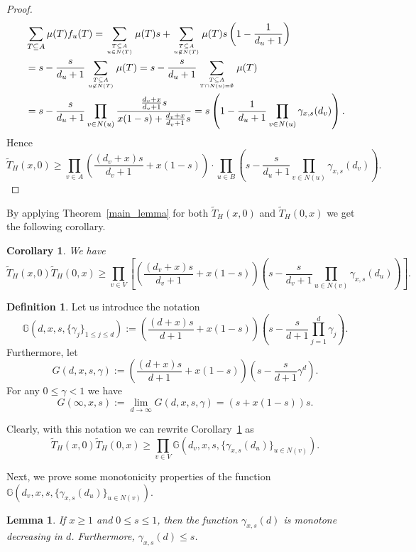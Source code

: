 \documentclass[12pt,a4paper]{amsart}
\numberwithin{equation}{section}
\theoremstyle{plain}
\newtheorem{Lemma}[Th]{Lemma}
\newtheorem{Cor}[Th]{Corollary}
\theoremstyle{definition}
\newtheorem{Def}[Th]{Definition}
\newcommand{\1}{\textbf{1}}
\begin{document}
\begin{proof}
\begin{align*}
&\sum_{T\subseteq A}\mu(T)f_u(T)=
\sum_{T\subseteq A \atop u\in N(T)}\mu(T)s+\sum_{T\subseteq A \atop u\not\in N(T)}\mu(T)s\left(1-\frac{1}{d_u+1}\right)\\
&=s-\frac{s}{d_u+1}\sum_{T\subseteq A \atop u\not\in N(T)}\mu(T)=s-\frac{s}{d_u+1}\sum_{T\subseteq A \atop T\cap N(u)=\emptyset}\mu(T)\\
&=s-\frac{s}{d_u+1}\prod_{v\in N(u)}\frac{\frac{d_v+x}{d_v+1}s}{x(1-s)+\frac{d_v+x}{d_v+1}s}=s\left(1-\frac{1}{d_u+1}\prod_{v\in N(u)}\gamma_{x,s}(d_v)\right).
\end{align*}
Hence
$$\widetilde{T}_H(x,0)\geqslant \prod_{v\in A}\left(\frac{(d_v+x)s}{d_v+1}+x(1-s)\right)\cdot \prod_{u\in B}\left(s-\frac{s}{d_u+1}\prod_{v\in N(u)}\gamma_{x,s}(d_v)\right).$$
\end{proof}

By applying Theorem~\ref{main_lemma} for both $\widetilde{T}_H(x,0)$ and $\widetilde{T}_H(0,x)$ we get the following corollary.

\begin{Cor} \label{cor: main_lemma}
We have
$$\widetilde{T}_H(x,0)\widetilde{T}_H(0,x)\geqslant \prod_{v\in V}\left[\left(\frac{(d_v+x)s}{d_v+1}+x(1-s)\right)\left(s-\frac{s}{d_v+1}\prod_{u\in N(v)}\gamma_{x,s}(d_u)\right)\right].$$
\end{Cor}

\begin{Def}
Let us introduce the notation
$$\mathbb{G}\left(d,x,s,\{\gamma_j\}_{1\leqslant j\leqslant d}\right):=\left(\frac{(d+x)s}{d+1}+x(1-s)\right)\left(s-\frac{s}{d+1}\prod_{j=1}^d\gamma_{j}\right).$$
Furthermore, let
$$G(d,x,s,\gamma):=\left(\frac{(d+x)s}{d+1}+x(1-s)\right)\left(s-\frac{s}{d+1}\gamma^d\right).$$
For any $0\leqslant   \gamma<1$ we have
$$G(\infty,x,s):=\lim_{d\to \infty}G(d,x,s,\gamma)=(s+x(1-s))s.$$
\end{Def}

Clearly, with this notation we can rewrite Corollary~\ref{cor: main_lemma} as
$$\widetilde{T}_H(x,0)\widetilde{T}_H(0,x)\geqslant \prod_{v\in V}\mathbb{G}\left(d_v,x,s,\{\gamma_{x,s}(d_u)\}_{u\in N(v)}\right).$$

Next, we prove some monotonicity properties of the function $\mathbb{G}\left(d_v,x,s,\{\gamma_{x,s}(d_u)\}_{u\in N(v)}\right)$.


\begin{Lemma} \label{monotonicity}
If $x\geqslant 1$ and $0\leqslant s\leqslant 1$, then the function $\gamma_{x,s}(d)$ is monotone decreasing in $d$. Furthermore, $\gamma_{x,s}(d)\leqslant s$.
\end{Lemma}
\end{document}
